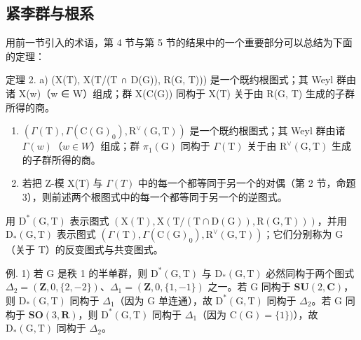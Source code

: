 \subsection{紧李群与根系}

用前一节引入的术语，第 4 节与第 5 节的结果中的一个重要部分可以总结为下面的定理：

定理 2. a) (X(T), X(T/(T ∩ D(G)), R(G, T))) 是一个既约根图式；其 Weyl 群由诸 X(w)（w ∈ W）组成；群 X(C(G)) 同构于 X(T) 关于由 R(G, T) 生成的子群所得的商。

\begin{enumerate}
\def\labelenumi{\alph{enumi})}
\setcounter{enumi}{1}
\item
  \((\Gamma(\mathrm{T}),\Gamma(\mathrm{C}(\mathrm{G})_{0}),\mathrm{R}^{\vee}(\mathrm{G},\mathrm{T}))\) 是一个既约根图式；其 Weyl 群由诸 \(\Gamma(w)\)（\(w\in W\)）组成；群 \(\pi_{1}(\mathrm{G})\) 同构于 \(\Gamma(\mathrm{T})\) 关于由 \(\mathrm{R}^{\vee}(\mathrm{G},\mathrm{T})\) 生成的子群所得的商。
\item
  若把 Z-模 X(T) 与 \(\Gamma(T)\) 中的每一个都等同于另一个的对偶（第 2 节，命题 3），则前述两个根图式中的每一个都等同于另一个的逆图式。
\end{enumerate}

用 \(\mathrm{D}^{*}(\mathrm{G},\mathrm{T})\) 表示图式 \((\mathrm{X}(\mathrm{T}),\mathrm{X}(\mathrm{T}/(\mathrm{T}\cap\mathrm{D}(\mathrm{G})),\mathrm{R}(\mathrm{G},\mathrm{T})))\)，并用 \(\mathrm{D}_{*}(\mathrm{G},\mathrm{T})\) 表示图式 \((\varGamma(\mathrm{T}),\varGamma(\mathrm{C}(\mathrm{G})_{0}),\mathrm{R}^{\vee}(\mathrm{G},\mathrm{T}))\)；它们分别称为 G（关于 T）的反变图式与共变图式。

例. 1) 若 G 是秩 1 的半单群，则 \(\mathrm{D}^{*}(\mathrm{G},\mathrm{T})\) 与 \(\mathrm{D}_{*}(\mathrm{G},\mathrm{T})\) 必然同构于两个图式 \(\Delta_{2}=(\mathbf{Z},0,\{2,-2\})\)、\(\Delta_{1}=(\mathbf{Z},0,\{1,-1\})\) 之一。若 G 同构于 \(\mathbf{SU}(2,\mathbf{C})\)，则 \(\mathrm{D}_{*}(\mathrm{G},\mathrm{T})\) 同构于 \(\Delta_{1}\)（因为 G 单连通），故 \(\mathrm{D}^{*}(\mathrm{G},\mathrm{T})\) 同构于 \(\Delta_{2}\)。若 G 同构于 \(\mathbf{SO}(3,\mathbf{R})\)，则 \(\mathrm{D}^{*}(\mathrm{G},\mathrm{T})\) 同构于 \(\Delta_{1}\)（因为 \(\mathrm{C}(\mathrm{G})=\{1\})\)），故 \(\mathrm{D}_{*}(\mathrm{G},\mathrm{T})\) 同构于 \(\Delta_{2}\)。

